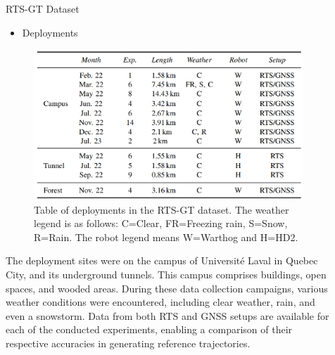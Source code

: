 \documentclass[final,hyperref={pdfpagelabels=false}]{beamer}
\begin{document}
\begin{frame}[t]
\begin{columns}[t]
\begin{column}{.465\textwidth}
\begin{block}{RTS-GT Dataset}
\begin{itemize}
    \item Deployments
\end{itemize}
    \vspace{4mm}
    \begin{figure}
        \includegraphics[width=0.72\linewidth]
            {figures/tableau_icra2024_deployment.png}%
        \captionsetup{width = 0.975\linewidth, justification=justified, name=Table 1}
        \caption{
            Table of deployments in the RTS-GT dataset. The weather legend is as follows: C=Clear, FR=Freezing rain, S=Snow, R=Rain. The robot legend means W=Warthog and H=HD2.}
        \label{fig:table_deployment}
    \end{figure}

The deployment sites were on the campus of Université Laval in Quebec City, and its underground tunnels.
This campus comprises buildings, open spaces, and wooded areas.
During these data collection campaigns, various weather conditions were encountered, including clear weather, rain, and even a snowstorm. 
Data from both \ac{RTS} and \ac{GNSS} setups are available for each of the conducted experiments, enabling a comparison of their respective accuracies in generating reference trajectories.
    
\end{block}


\end{column} %

\begin{column}{.03\textwidth}\end{column} %
 
\begin{column}{.465\textwidth} %



\end{column}
\end{columns}
\end{frame}
\end{document}
